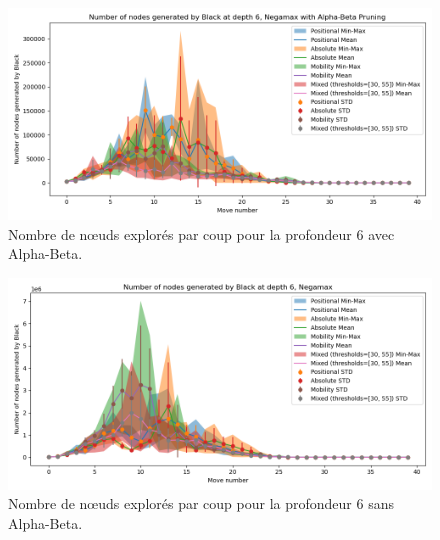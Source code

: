 \begin{figure}[H]
    \centering
    \includegraphics[width=1\textwidth]{ressources/Number of nodes generated by Black_depth_6_Negamax with Alpha-Beta Pruning.png}
    \caption{Nombre de nœuds explorés par coup pour la profondeur 6 avec Alpha-Beta.}
    \label{fig:node_explored_alpha_beta_6}
\end{figure}

\begin{figure}[H]
    \centering
    \includegraphics[width=1\textwidth]{ressources/Number of nodes generated by Black_depth_6_Negamax.png}
    \caption{Nombre de nœuds explorés par coup pour la profondeur 6 sans Alpha-Beta.}
    \label{fig:node_explored_negamax_6}
\end{figure}

